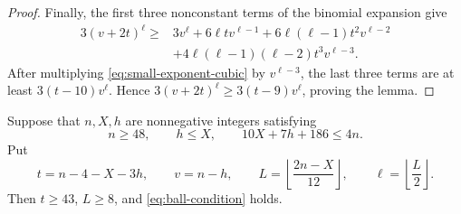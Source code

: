 \begin{proof}
Finally, the first three nonconstant terms of the binomial expansion give
\begin{align*}
3(v+2t)^\ell\ge{}&3v^\ell+6\ell t v^{\ell-1}
 +6\ell(\ell-1)t^2v^{\ell-2}\\
&+4\ell(\ell-1)(\ell-2)t^3v^{\ell-3}.
\end{align*}
After multiplying \eqref{eq:small-exponent-cubic} by
\(v^{\ell-3}\), the last three terms are at least
\(3(t-10)v^\ell\).  Hence
\(3(v+2t)^\ell\ge3(t-9)v^\ell\), proving the lemma.
\end{proof}

\begin{proposition}\label{prop:moore-arithmetic}
Suppose that \(n,X,h\) are nonnegative integers satisfying
\[
 n\ge48,
 \qquad h\le X,
 \qquad 10X+7h+186\le4n.
\]
Put
\[
 t=n-4-X-3h,\qquad v=n-h,\qquad
 L=\left\lfloor\frac{2n-X}{12}\right\rfloor,\qquad
 \ell=\left\lfloor\frac L2\right\rfloor.
\]
Then \(t\ge43\), \(L\ge8\), and \eqref{eq:ball-condition} holds.
\end{proposition}

